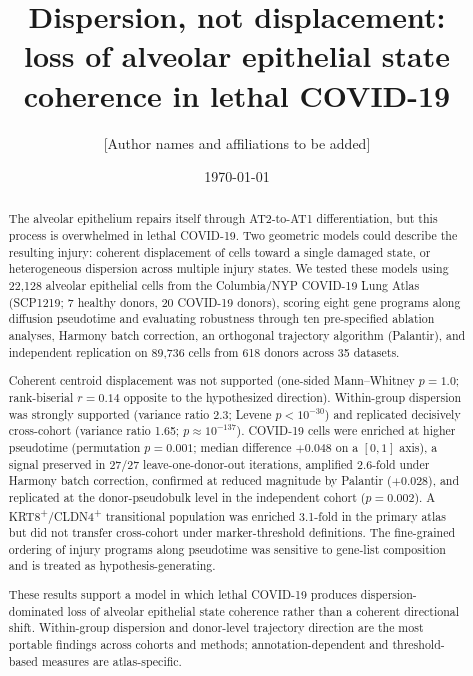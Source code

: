 \documentclass[11pt]{article}
\title{Dispersion, not displacement:\\loss of alveolar epithelial state coherence in lethal COVID-19}
\author{[Author names and affiliations to be added]}
\date{\today}
\begin{document}
\maketitle

\begin{abstract}
\noindent
The alveolar epithelium repairs itself through AT2-to-AT1 differentiation, but this process is overwhelmed in lethal COVID-19. Two geometric models could describe the resulting injury: coherent displacement of cells toward a single damaged state, or heterogeneous dispersion across multiple injury states. We tested these models using 22{,}128 alveolar epithelial cells from the Columbia/NYP COVID-19 Lung Atlas (SCP1219; 7 healthy donors, 20 COVID-19 donors), scoring eight gene programs along diffusion pseudotime and evaluating robustness through ten pre-specified ablation analyses, Harmony batch correction, an orthogonal trajectory algorithm (Palantir), and independent replication on 89{,}736 cells from 618 donors across 35 datasets.

Coherent centroid displacement was not supported (one-sided Mann--Whitney $p = 1.0$; rank-biserial $r = 0.14$ opposite to the hypothesized direction). Within-group dispersion was strongly supported (variance ratio 2.3; Levene $p < 10^{-30}$) and replicated decisively cross-cohort (variance ratio 1.65; $p \approx 10^{-137}$). COVID-19 cells were enriched at higher pseudotime (permutation $p = 0.001$; median difference $+0.048$ on a $[0,1]$ axis), a signal preserved in 27/27 leave-one-donor-out iterations, amplified 2.6-fold under Harmony batch correction, confirmed at reduced magnitude by Palantir ($+0.028$), and replicated at the donor-pseudobulk level in the independent cohort ($p = 0.002$). A KRT8\textsuperscript{+}/CLDN4\textsuperscript{+} transitional population was enriched 3.1-fold in the primary atlas but did not transfer cross-cohort under marker-threshold definitions. The fine-grained ordering of injury programs along pseudotime was sensitive to gene-list composition and is treated as hypothesis-generating.

These results support a model in which lethal COVID-19 produces dispersion-dominated loss of alveolar epithelial state coherence rather than a coherent directional shift. Within-group dispersion and donor-level trajectory direction are the most portable findings across cohorts and methods; annotation-dependent and threshold-based measures are atlas-specific.
\end{abstract}
\end{document}
